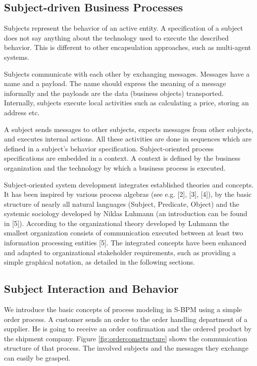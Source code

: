 \subsection{Subject-driven Business Processes}

Subjects represent the behavior of an active entity. A specification of a subject does not say anything about the technology used to execute the described behavior. This is different to other encapsulation approaches, such as multi-agent systems.

Subjects communicate with each other by exchanging messages. Messages have a name and a payload. The name should express the meaning of a message informally and the payloads are the data (business objects) transported. Internally, subjects execute local activities such as calculating a price, storing an address etc.

A subject sends messages to other subjects, expects messages from other subjects, and executes internal actions. All these activities are done in sequences which are defined in a subject's behavior specification.
Subject-oriented process specifications are embedded in a context. A context is defined by the business organization and the technology by which a business process is executed.

Subject-oriented system development integrates established theories and concepts. It has been inspired by various process algebras (see e.g. [2], [3], [4]), by the basic structure of nearly all natural languages (Subject, Predicate, Object) and the systemic sociology developed by Niklas Luhmann (an introduction can be found in [5]). According to the organizational theory developed by Luhmann the smallest organization consists of communication executed between at least two information processing entities [5]. The integrated concepts have been enhanced and adapted to organizational stakeholder requirements, such as providing a simple graphical notation, as detailed in the following sections.

\subsection{Subject Interaction and Behavior}

We introduce the basic concepts of process modeling in S-BPM using a simple order process. A customer sends an order to the order handling department of a supplier. He is going to receive an order confirmation and the ordered product by the shipment company. Figure \ref{fig:ordercomstructure} shows the communication structure of that process. The involved subjects and the messages they exchange can easily be grasped. 

